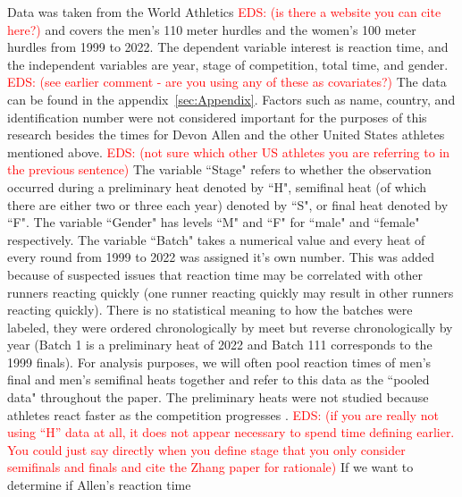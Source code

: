 \documentclass[12pt, letterpaper, titlepage]{article}
\newcommand{\eds}[1]{\textcolor{red}{EDS: (#1)}}
\begin{document}
Data was taken from the World Athletics 
\eds{is there a website you can cite here?}
and covers the men's 110 meter hurdles 
and the women's 100 meter hurdles from 1999 to 2022.  The dependent
variable interest is reaction time, and the independent variables are year, 
stage of competition, total time, and gender.  \eds{see earlier comment - 
are you using any of these as covariates?}
The data can be found in the appendix~\ref{sec:Appendix}. Factors such as name, 
country, and identification number were not considered important for the 
purposes of this research besides the times for Devon Allen and the other 
United States athletes mentioned above. \eds{not sure which other US athletes 
you are referring to in the previous sentence} 
The variable ``Stage" refers to whether the observation occurred during a 
preliminary heat denoted by ``H", semifinal heat (of which there are either two
or three each year) denoted by ``S", or final heat denoted by ``F". The variable 
``Gender" has levels ``M" and ``F" for ``male" and ``female" respectively.  The
variable ``Batch" takes a 
numerical value and every heat of every round from 1999 to 2022 was assigned it's
own number.  This was added because of suspected issues that reaction time may be
correlated with other runners reacting quickly (one runner reacting quickly may
result in other runners reacting quickly). There is no statistical meaning to
how the batches were labeled, they were ordered chronologically by meet but
reverse chronologically by year (Batch 1 is a preliminary heat of 2022 and Batch
111 corresponds to the 1999 finals). %
For analysis purposes, we will often pool reaction times of men's final and 
men's semifinal heats together and refer to this data as the ``pooled data"
throughout the paper.  %
The preliminary heats were not studied because athletes react faster as the 
competition progresses \citep[e.g.,][]{zhang2021correlation}. %
\eds{if you are really not using ``H'' data at all, it does not appear necessary
to spend time defining earlier.  You could just say directly when you define 
stage that you only consider semifinals and finals and cite the Zhang paper for 
rationale}
If we want to determine if Allen's reaction time
\end{document}
